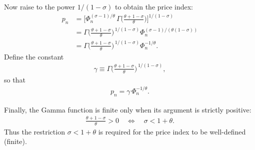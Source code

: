 \begin{solution}
Now raise to the power $1/(1-\sigma)$ to obtain the price index:
\begin{align*}
p_n
&= \Bigg[\Phi_n^{(\sigma-1)/\theta}\,
    \Gamma\!\Big(\frac{\theta+1-\sigma}{\theta}\Big)\Bigg]^{\!1/(1-\sigma)} \\
&= \Gamma\!\Big(\frac{\theta+1-\sigma}{\theta}\Big)^{\,1/(1-\sigma)}
    \Phi_n^{(\sigma-1)/( \theta(1-\sigma))} \\
&= \Gamma\!\Big(\frac{\theta+1-\sigma}{\theta}\Big)^{\,1/(1-\sigma)}
    \Phi_n^{-1/\theta}.
\end{align*}
Define the constant
\begin{align*}
\gamma \equiv \Gamma\!\Big(\frac{\theta+1-\sigma}{\theta}\Big)^{\,1/(1-\sigma)},
\end{align*}
so that
\begin{align*}
p_n = \gamma\, \Phi_n^{-1/\theta}.
\end{align*}

Finally, the Gamma function is finite only when its argument is strictly positive:
\begin{align*}
\frac{\theta+1-\sigma}{\theta} > 0 \quad\Longleftrightarrow\quad \sigma < 1+\theta.
\end{align*}
Thus the restriction $\sigma<1+\theta$ is required for the price index to be well-defined (finite).
\end{solution}

